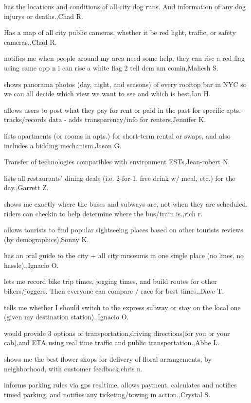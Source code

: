 \documentclass{article}
\begin{document}
has the locations and conditions of all city dog runs. And information of any dog injurys or deaths.,Chad R.

Has a map of all city public cameras, whether it be red light, traffic, or safety cameras.,Chad R.

notifies me when people around my area need some help, they can rise a red flag using same app n i can rise a white flag 2 tell dem am comin,Mahesh S.

shows panorama photos (day, night, and seasons) of every rooftop bar in NYC so we can all decide which view we want to see and which is best,Ian H.

allows users to post what they pay for rent or paid in the past for specific apts.-tracks/records data - adds transparency/info for renters,Jennifer K.

lists apartments (or rooms in apts.) for short-term rental or swaps, and also includes a bidding mechanism,Jason G.

Transfer of technologies compatibles with environment ESTs,Jean-robert N.

lists all restaurants' dining deals (i.e. 2-for-1, free drink w/ meal, etc.) for the day.,Garrett Z.

shows me exactly where the buses and subways are, not when they are scheduled. riders can checkin to help determine where the bus/train is.,rich r.

allows tourists to find popular sightseeing places based on other tourists reviews (by demographics),Sonny K.

has an oral guide to the city + all city museums in one single place (no lines, no hassle).,Ignacio O.

lets me record bike trip times, jogging times, and build routes for other bikers/joggers. Then everyone can compare / race for best times.,Dave T.

tells me whether I should switch to the express subway or stay on the local one (given my destination station).,Ignacio O.

would provide 3 options of transportation,driving directions(for you or your cab),and ETA using real time traffic and public transportation.,Abbe L.

shows me the best flower shops for delivery of floral arrangements, by neighborhood, with customer feedback,chris n.

informs parking rules via gps realtime, allows payment, calculates and notifies timed parking, and notifies any ticketing/towing in action.,Crystal  S.
\end{document}
